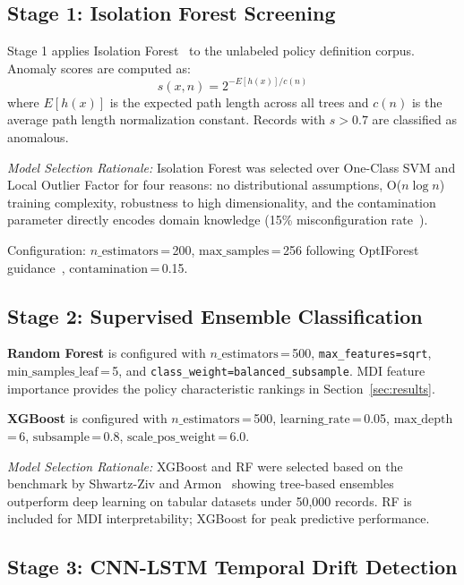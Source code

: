 \documentclass[conference]{IEEEtran}
\begin{document}
\subsection{Stage 1: Isolation Forest Screening}
Stage 1 applies Isolation Forest~\cite{liu2008} to the unlabeled 
policy definition corpus. Anomaly scores are computed as:
\begin{equation}
  s(x,n) = 2^{-E[h(x)]/c(n)}
\end{equation}
where $E[h(x)]$ is the expected path length across all trees and 
$c(n)$ is the average path length normalization constant. Records 
with $s > 0.7$ are classified as anomalous.

\textit{Model Selection Rationale:} Isolation Forest was selected 
over One-Class SVM and Local Outlier Factor for four reasons: no 
distributional assumptions, O($n \log n$) training complexity, 
robustness to high dimensionality, and the contamination parameter 
directly encodes domain knowledge (15\% misconfiguration rate~\cite{ibm2024}).

Configuration: $n\_\text{estimators}$\,=\,200, $\text{max\_samples}$\,=\,256 
following OptIForest guidance~\cite{xiang2023}, 
$\text{contamination}$\,=\,0.15.

\subsection{Stage 2: Supervised Ensemble Classification}

\textbf{Random Forest} is configured with $n\_\text{estimators}$\,=\,500, 
\texttt{max\_features=sqrt}, $\text{min\_samples\_leaf}$\,=\,5, and 
\texttt{class\_weight=balanced\_subsample}. MDI feature importance 
provides the policy characteristic rankings in Section~\ref{sec:results}.

\textbf{XGBoost} is configured with $n\_\text{estimators}$\,=\,500, 
$\text{learning\_rate}$\,=\,0.05, $\text{max\_depth}$\,=\,6, 
$\text{subsample}$\,=\,0.8, $\text{scale\_pos\_weight}$\,=\,6.0.

\textit{Model Selection Rationale:} XGBoost and RF were selected based 
on the benchmark by Shwartz-Ziv and Armon~\cite{shwartzziv2022} showing 
tree-based ensembles outperform deep learning on tabular datasets under 
50,000 records. RF is included for MDI interpretability; XGBoost for 
peak predictive performance.

\subsection{Stage 3: CNN-LSTM Temporal Drift Detection}
\end{document}
